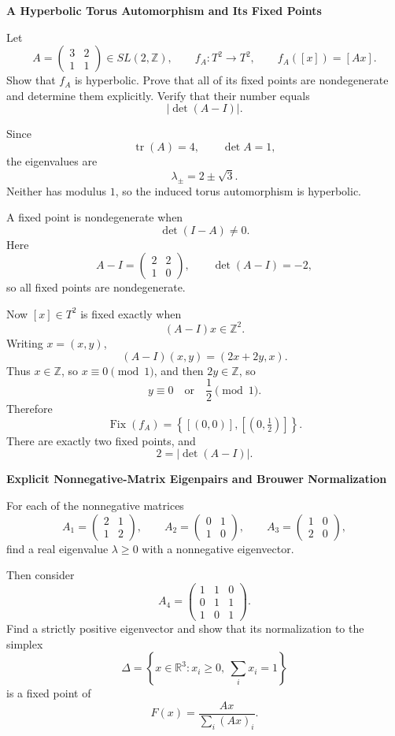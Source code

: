 \begin{problem}[CP-I-0007]
\label{prob:cp-i-0007}
\textbf{A Hyperbolic Torus Automorphism and Its Fixed Points}

\hspace*{1.5em}Let
\[
A=
\begin{pmatrix}
3&2\\
1&1
\end{pmatrix}\in SL(2,\mathbb Z),
\qquad
f_A:T^2\to T^2,
\qquad
f_A([x])=[Ax].
\]
Show that \(f_A\) is hyperbolic. Prove that all of its fixed points are nondegenerate and determine
them explicitly. Verify that their number equals
\[
|\det(A-I)|.
\]
\end{problem}

\begin{solution}
Since
\[
\operatorname{tr}(A)=4,\qquad \det A=1,
\]
the eigenvalues are
\[
\lambda_\pm=2\pm\sqrt3.
\]
Neither has modulus \(1\), so the induced torus automorphism is hyperbolic.

A fixed point is nondegenerate when
\[
\det(I-A)\ne0.
\]
Here
\[
A-I=
\begin{pmatrix}
2&2\\
1&0
\end{pmatrix},
\qquad
\det(A-I)=-2,
\]
so all fixed points are nondegenerate.

Now \([x]\in T^2\) is fixed exactly when
\[
(A-I)x\in\mathbb Z^2.
\]
Writing \(x=(x,y)\),
\[
(A-I)(x,y)=(2x+2y,x).
\]
Thus \(x\in\mathbb Z\), so \(x\equiv0\pmod1\), and then \(2y\in\mathbb Z\), so
\[
y\equiv0\quad\text{or}\quad \frac12\pmod1.
\]
Therefore
\[
\operatorname{Fix}(f_A)
=
\left\{[(0,0)],\left[(0,\tfrac12)\right]\right\}.
\]
There are exactly two fixed points, and
\[
2=|\det(A-I)|.
\]
\end{solution}

\begin{problem}[CP-I-0008]
\label{prob:cp-i-0008}
\textbf{Explicit Nonnegative-Matrix Eigenpairs and Brouwer Normalization}

\hspace*{1.5em}For each of the nonnegative matrices
\[
A_1=
\begin{pmatrix}
2&1\\
1&2
\end{pmatrix},
\qquad
A_2=
\begin{pmatrix}
0&1\\
1&0
\end{pmatrix},
\qquad
A_3=
\begin{pmatrix}
1&0\\
2&0
\end{pmatrix},
\]
find a real eigenvalue \(\lambda\ge0\) with a nonnegative eigenvector.

Then consider
\[
A_4=
\begin{pmatrix}
1&1&0\\
0&1&1\\
1&0&1
\end{pmatrix}.
\]
Find a strictly positive eigenvector and show that its normalization to the simplex
\[
\Delta=\left\{x\in\mathbb R^3:x_i\ge0,\ \sum_i x_i=1\right\}
\]
is a fixed point of
\[
F(x)=\frac{Ax}{\sum_i(Ax)_i}.
\]
\end{problem}

